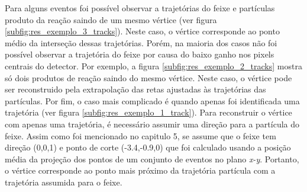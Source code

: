 \documentclass[a4paper,12pt,oneside]{book}
\begin{document}
\par Para alguns eventos foi possível observar a trajetórias do feixe e partículas produto da reação saindo de um mesmo vértice (ver figura \ref{subfig:res_exemplo_3_tracks}). Neste caso, o vértice corresponde ao ponto médio da interseção dessas trajetórias. Porém, na maioria dos casos não foi possível observar a trajetória do feixe por causa do baixo ganho nos pixels centrais do detector. Por exemplo, a figura \ref{subfig:res_exemplo_2_tracks} mostra só dois produtos de reação saindo do mesmo vértice. Neste caso, o vértice pode ser reconstruido pela extrapolação das retas ajustadas às trajetórias das partículas. Por fim, o caso mais complicado é quando apenas foi identificada uma trajetória (ver figura \ref{subfig:res_exemplo_1_track}). Para reconstruir o vértice com apenas uma trajetória, é necessário assumir uma direção para a partícula do feixe. Assim como foi mencionado no capitulo 5, se assume que o feixe tem direção (0,0,1) e ponto de corte (-3.4,-0.9,0) que foi calculado usando a posição média da projeção dos pontos de um conjunto de eventos no plano \textit{x-y}. Portanto, o vértice corresponde ao ponto mais próximo da trajetória partícula com a trajetória assumida para o feixe.
\end{document}
